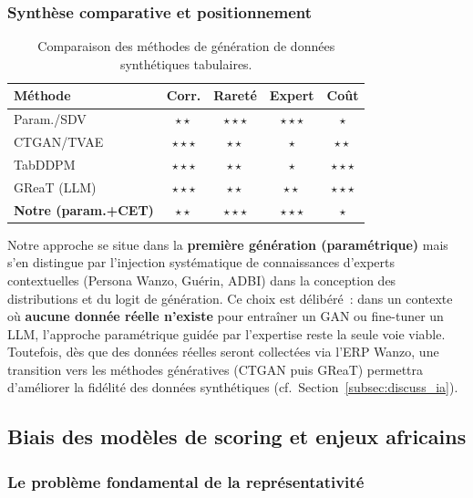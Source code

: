\documentclass[12pt, a4paper, twocolumn]{article}
\begin{document}
\subsubsection{Synthèse comparative et positionnement}
\label{subsubsec:synth_synthese}

\begin{table}[htbp]
\centering
\caption{Comparaison des méthodes de génération de données synthétiques tabulaires.}
\label{tab:synth_comp}
\small
\begin{tabularx}{\columnwidth}{@{}Xcccc@{}}
\toprule
\textbf{Méthode} & \textbf{Corr.} & \textbf{Rareté} & \textbf{Expert} & \textbf{Coût} \\
\midrule
Param./SDV & $\star\star$ & $\star\star\star$ & $\star\star\star$ & $\star$ \\
CTGAN/TVAE & $\star\star\star$ & $\star\star$ & $\star$ & $\star\star$ \\
TabDDPM & $\star\star\star$ & $\star\star$ & $\star$ & $\star\star\star$ \\
GReaT (LLM) & $\star\star\star$ & $\star\star$ & $\star\star$ & $\star\star\star$ \\
\textbf{Notre (param.+CET)} & $\star\star$ & $\star\star\star$ & $\star\star\star$ & $\star$ \\
\bottomrule
\end{tabularx}
\end{table}

Notre approche se situe dans la \textbf{première génération (paramétrique)} mais s'en distingue par l'injection systématique de connaissances d'experts contextuelles (Persona Wanzo, Guérin, ADBI) dans la conception des distributions et du logit de génération. Ce choix est délibéré~: dans un contexte où \textbf{aucune donnée réelle n'existe} pour entraîner un GAN ou fine-tuner un LLM, l'approche paramétrique guidée par l'expertise reste la seule voie viable. Toutefois, dès que des données réelles seront collectées via l'ERP Wanzo, une transition vers les méthodes génératives (CTGAN puis GReaT) permettra d'améliorer la fidélité des données synthétiques (cf.\ Section~\ref{subsec:discuss_ia}).

\subsection{Biais des modèles de scoring et enjeux africains}
\label{subsec:biais}

\subsubsection{Le problème fondamental de la représentativité}
\label{subsubsec:biais_represent}
\end{document}
